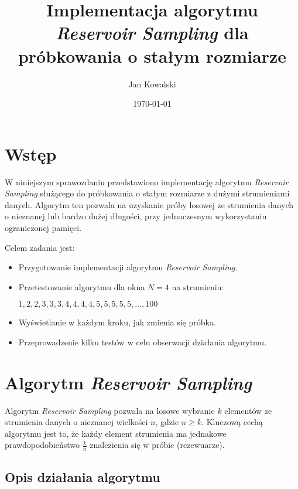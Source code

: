 \documentclass{article}
\begin{document}
\title{Implementacja algorytmu \textit{Reservoir Sampling} dla próbkowania o stałym rozmiarze}
\author{Jan Kowalski}
\date{\today}

\maketitle

\tableofcontents

\section{Wstęp}

W niniejszym sprawozdaniu przedstawiono implementację algorytmu \textit{Reservoir Sampling} służącego do próbkowania o stałym rozmiarze z dużymi strumieniami danych. Algorytm ten pozwala na uzyskanie próby losowej ze strumienia danych o nieznanej lub bardzo dużej długości, przy jednoczesnym wykorzystaniu ograniczonej pamięci.

Celem zadania jest:

\begin{itemize}
    \item Przygotowanie implementacji algorytmu \textit{Reservoir Sampling}.
    \item Przetestowanie algorytmu dla okna $N = 4$ na strumieniu:
    \begin{center}
    $1, 2, 2, 3, 3, 3, 4, 4, 4, 4, 5, 5, 5, 5, 5, \dots, 100$
    \end{center}
    \item Wyświetlanie w każdym kroku, jak zmienia się próbka.
    \item Przeprowadzenie kilku testów w celu obserwacji działania algorytmu.
\end{itemize}

\section{Algorytm \textit{Reservoir Sampling}}

Algorytm \textit{Reservoir Sampling} pozwala na losowe wybranie $k$ elementów ze strumienia danych o nieznanej wielkości $n$, gdzie $n \geq k$. Kluczową cechą algorytmu jest to, że każdy element strumienia ma jednakowe prawdopodobieństwo $\frac{k}{n}$ znalezienia się w próbie (rezewuarze).

\subsection{Opis działania algorytmu}
\end{document}
